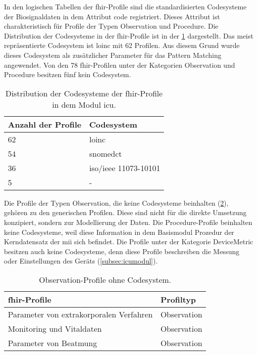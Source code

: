 In den logischen Tabellen der \ac{fhir}-Profile sind die standardisierten Codesysteme der Biosignaldaten in dem Attribut \glqq code\grqq{} registriert. Dieses Attribut ist charakteristisch für Profile der Typen \glqq Observation\grqq{} und \glqq Procedure\grqq{}. Die Distribution der Codesysteme in der \ac{fhir}-Profile ist in der \ref{tab:profilcodes} dargestellt. Das meist repräsentierte Codesystem ist \ac{loinc} mit 62 Profilen. Aus diesem Grund wurde dieses Codesystem als zusätzlicher Parameter für das Pattern Matching angewendet. Von den 78 \ac{fhir}-Profilen unter der Kategorien \glqq Observation\grqq{} und \glqq Procedure\grqq{} besitzen fünf kein Codesystem.


\begin{table}[ht]
	\centering 
	\caption[Codesysteme der \acs{fhir}-Profile in dem Modul \glqq\acs{icu}\grqq{}]{Distribution der Codesysteme der \acs{fhir}-Profile in dem Modul \glqq\acs{icu}\grqq{}.}
	\label{tab:profilcodes}
	\begin{tabular}{|l|l|}
		\hline
		\bfseries Anzahl der Profile & \bfseries Codesystem \\ \hline		
		62 & \ac{loinc} \\ \hline
		54 & \ac{snomedct} \\ \hline   
		36 & \acs{iso}/\acs{ieee} 11073-10101\texttrademark{} \\ \hline
		5 & - \\ \hline
	\end{tabular}
\end{table}

Die Profile der Typen \glqq Observation\grqq{}, die keine Codesysteme beinhalten (\ref{tab:profilnocode}), gehören zu den generischen Profilen. Diese sind nicht für die direkte Umsetzung konzipiert, sondern zur Modellierung der Daten. Die \glqq Procedure\grqq{}-Profile beinhalten keine Codesysteme, weil diese Information in dem Basismodul \glqq Prozedur\grqq{} der Kerndatensatz der \ac{mii} sich befindet. Die Profile unter der Kategorie \glqq DeviceMetric\grqq{} besitzen auch keine Codesysteme, denn diese Profile beschreiben die Messung oder Einstellungen des Geräts (\ref{subsec:icumodul}).

\begin{table}[ht]
	\centering  
	\caption[\glqq Observation\grqq{}-Profile ohne Codesystem]{\glqq Observation\grqq{}-Profile ohne Codesystem.}
	\label{tab:profilnocode}
	\begin{tabular}{|p{8.5cm}|l|}
		\hline 
		\bfseries \ac{fhir}-Profile & \bfseries Profiltyp \\ \hline
		Parameter von extrakorporalen Verfahren & Observation \\ \hline
		Monitoring und Vitaldaten  & Observation \\ \hline
		Parameter von Beatmung  & Observation \\ \hline
	\end{tabular}
\end{table}

